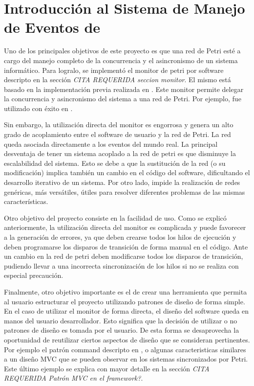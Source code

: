 \section{Introducción al Sistema de Manejo de Eventos de \nombreFramework}
Uno de los principales objetivos de este proyecto es que una red de Petri esté a
cargo del manejo completo de la concurrencia y el asincronismo de un sistema informático. Para
logralo, se implementó el monitor de petri por software descripto en la
sección \emph{\color{red} CITA REQUERIDA seccion monitor}.
El mismo está basado en la implementación previa realizada en \cite{codegen}.
Este monitor permite delegar la concurrencia y asincronismo del
sistema a una red de Petri. Por ejemplo, fue utilizado con éxito en
\cite{Bentivegna-Ludemann}.

Sin embargo, la utilización directa del monitor es engorrosa y genera un
alto grado de acoplamiento entre el software de usuario y la red de Petri. La
red queda asociada directamente a los eventos del mundo real. La principal
desventaja de tener un sistema acoplado a la red de petri es que disminuye la
escalabilidad del sistema. Esto se debe a que la sustitución de la red (o su modificación) implica
también un cambio en el código del software, dificultando el desarrollo
iterativo de un sistema. Por otro lado, impide la realización de redes
genéricas, más versátiles, útiles para resolver diferentes problemas de las
mismas características.

Otro objetivo del proyecto consiste en la facilidad de uso. Como se explicó
anteriormente, la utilización directa del monitor es complicada y puede
favorecer a la generación de errores, ya que deben crearse todos los hilos de
ejecución y deben programarse los disparos de transición de forma manual en el
código. Ante un cambio en la red de petri deben modificarse todos los disparos
de transición, pudiendo llevar a una incorrecta sincronización de los hilos si
no se realiza con especial precaución.

Finalmente, otro objetivo importante es el de crear una herramienta que permita
al usuario estructurar el proyecto utilizando patrones de diseño de forma
simple. En el caso de utilizar el monitor de forma directa, el diseño del
software queda en manos del usuario desarrollador. Esto significa que la
decisión de utilizar o no patrones de diseño es tomada por el usuario. De
esta forma se desaprovecha la oportunidad de reutilizar ciertos aspectos de
diseño que se consideran pertinentes. Por ejemplo el patrón command descripto en
\cite{chimp}, o algunas caracteristicas similares a un diseño MVC que se pueden
observar en los sistemas sincronizados por Petri. Este último ejemplo se explica
con mayor detalle en la sección \emph{\color{red} CITA REQUERIDA Patrón MVC
en el framework?}.


